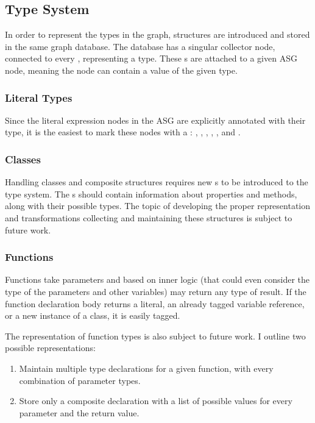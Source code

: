 \subsection{Type System}
In order to represent the types in the graph, structures are introduced and stored in the same graph database. The database has a singular  collector node, connected to every , representing a type. These s are attached to a given ASG node, meaning the node can contain a value of the given type.

\subsubsection{Literal Types}
Since the literal expression nodes in the ASG are explicitly annotated with their type, it is the easiest to mark these nodes with a : , , , , , and .

\subsubsection{Classes}
Handling classes and composite structures requires new s to be introduced to the type system. The s should contain information about properties and methods, along with their possible types. The topic of developing the proper representation and transformations collecting and maintaining these structures is subject to future work.

\subsubsection{Functions}
Functions take parameters and based on inner logic (that could even consider the type of the parameters and other variables) may return any type of result. If the function declaration body returns a literal, an already tagged variable reference, or a new instance of a class, it is easily tagged.

The representation of function types is also subject to future work. I outline two possible representations:
\begin{enumerate}
	\item Maintain multiple type declarations for a given function, with every combination of parameter types.
	\item Store only a composite declaration with a list of possible values for every parameter and the return value.
\end{enumerate}

